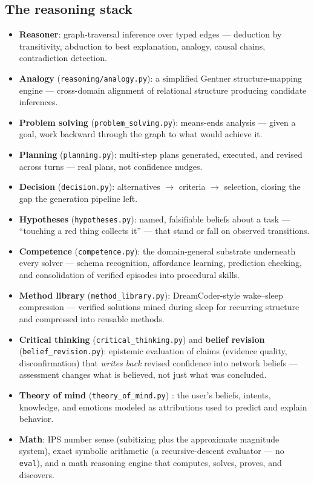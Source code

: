 \documentclass[11pt]{article}
\newcommand{\code}[1]{\texttt{\small #1}}
\begin{document}
\subsection{The reasoning stack}

\begin{itemize}
  \item \textbf{Reasoner}: graph-traversal inference over typed edges
    --- deduction by transitivity, abduction to best explanation,
    analogy, causal chains, contradiction detection.
  \item \textbf{Analogy} (\code{reasoning/analogy.py}): a simplified
    Gentner structure-mapping engine \cite{gentner} --- cross-domain alignment of
    relational structure producing candidate inferences.
  \item \textbf{Problem solving} (\code{problem\_solving.py}):
    means-ends analysis --- given a goal, work backward through the
    graph to what would achieve it.
  \item \textbf{Planning} (\code{planning.py}): multi-step plans
    generated, executed, and revised across turns --- real plans, not
    confidence nudges.
  \item \textbf{Decision} (\code{decision.py}): alternatives
    $\to$ criteria $\to$ selection, closing the gap the generation
    pipeline left.
  \item \textbf{Hypotheses} (\code{hypotheses.py}): named, falsifiable
    beliefs about a task --- ``touching a red thing collects it'' ---
    that stand or fall on observed transitions.
  \item \textbf{Competence} (\code{competence.py}): the domain-general
    substrate underneath every solver --- schema recognition,
    affordance learning, prediction checking, and consolidation of
    verified episodes into procedural skills.
  \item \textbf{Method library} (\code{method\_library.py}):
    DreamCoder-style wake--sleep compression \cite{dreamcoder} --- verified solutions
    mined during sleep for recurring structure and compressed into
    reusable methods.
  \item \textbf{Critical thinking} (\code{critical\_thinking.py}) and
    \textbf{belief revision} (\code{belief\_revision.py}): epistemic
    evaluation of claims (evidence quality, disconfirmation) that
    \emph{writes back} revised confidence into network beliefs ---
    assessment changes what is believed, not just what was concluded.
  \item \textbf{Theory of mind} (\code{theory\_of\_mind.py}) \cite{premack}: the
    user's beliefs, intents, knowledge, and emotions modeled as
    attributions used to predict and explain behavior.
  \item \textbf{Math}: IPS number sense (subitizing plus the
    approximate magnitude system), exact symbolic arithmetic (a
    recursive-descent evaluator --- no \code{eval}), and a math
    reasoning engine that computes, solves, proves, and discovers.
\end{itemize}
\end{document}
